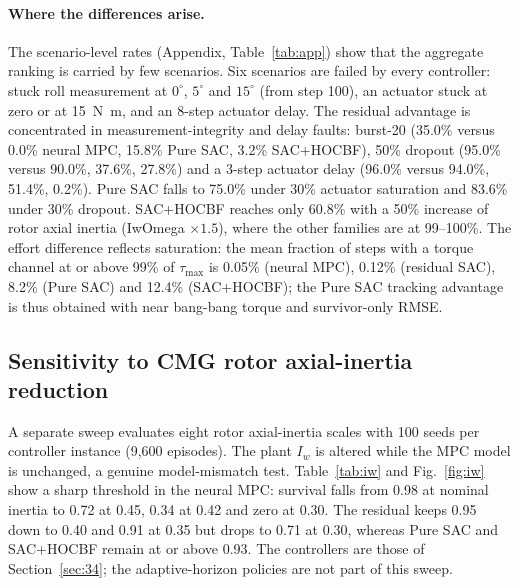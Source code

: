 \documentclass[preprint,12pt,authoryear=false]{elsarticle}
\theoremstyle{remark}\newtheorem{remark}{Remark}
\theoremstyle{plain}\newtheorem{proposition}{Proposition}\newtheorem{lemma}{Lemma}
\theoremstyle{definition}\newtheorem{assumption}{Assumption}
\newcommand{\tmax}{\tau_{\max}}
\begin{document}
\paragraph{Where the differences arise.} The scenario-level rates (Appendix, Table~\ref{tab:app}) show that the aggregate ranking is carried by few scenarios. Six scenarios are failed by every controller: stuck roll measurement at $0^\circ$, $5^\circ$ and $15^\circ$ (from step 100), an actuator stuck at zero or at \SI{15}{N.m}, and an 8-step actuator delay. The residual advantage is concentrated in measurement-integrity and delay faults: burst-20 (35.0\% versus 0.0\% neural MPC, 15.8\% Pure SAC, 3.2\% SAC+HOCBF), 50\% dropout (95.0\% versus 90.0\%, 37.6\%, 27.8\%) and a 3-step actuator delay (96.0\% versus 94.0\%, 51.4\%, 0.2\%). Pure SAC falls to 75.0\% under 30\% actuator saturation and 83.6\% under 30\% dropout. SAC+HOCBF reaches only 60.8\% with a 50\% increase of rotor axial inertia (IwOmega $\times1.5$), where the other families are at 99--100\%. The effort difference reflects saturation: the mean fraction of steps with a torque channel at or above 99\% of $\tmax$ is 0.05\% (neural MPC), 0.12\% (residual SAC), 8.2\% (Pure SAC) and 12.4\% (SAC+HOCBF); the Pure SAC tracking advantage is thus obtained with near bang-bang torque and survivor-only RMSE.

\subsection{Sensitivity to CMG rotor axial-inertia reduction}\label{sec:inertia}
A separate sweep evaluates eight rotor axial-inertia scales with 100 seeds per controller instance (9{,}600 episodes). The plant $I_w$ is altered while the MPC model is unchanged, a genuine model-mismatch test. Table~\ref{tab:iw} and Fig.~\ref{fig:iw} show a sharp threshold in the neural MPC: survival falls from 0.98 at nominal inertia to 0.72 at 0.45, 0.34 at 0.42 and zero at 0.30. The residual keeps 0.95 down to 0.40 and 0.91 at 0.35 but drops to 0.71 at 0.30, whereas Pure SAC and SAC+HOCBF remain at or above 0.93. The controllers are those of Section~\ref{sec:34}; the adaptive-horizon policies are not part of this sweep.
\end{document}
